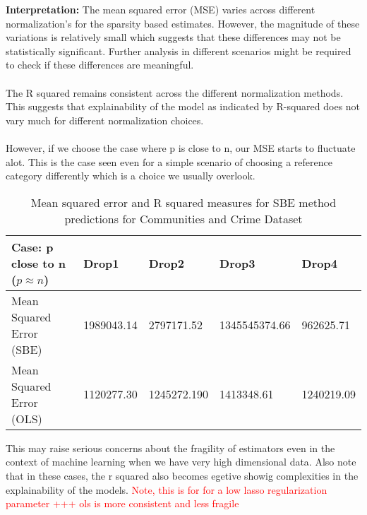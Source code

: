 \textbf{Interpretation:} 
The mean squared error (MSE) varies across different normalization's for the sparsity based estimates. However, the magnitude of these variations is relatively small which suggests that these differences may not be statistically significant. Further analysis in different scenarios might be required to check if these differences are meaningful. \\
\\
The R squared remains consistent across the different normalization methods. This suggests that explainability of the model as indicated by R-squared does not vary much for different normalization choices. \\
\\
However, if we choose the case where p is close to n, our MSE starts to fluctuate alot. This is the case seen even for a simple scenario of choosing a reference category differently which is a choice we usually overlook. 
\begin{table}[h!]
\renewcommand{\arraystretch}{1.5}
\centering
\begin{tabular}{||l l l l l||} 
 \hline
 \hline
 Case: p close to n ($p \approx n$) & Drop1 & Drop2 & Drop3 & Drop4 \\ [0.5ex] 
 \hline \hline
 Mean Squared Error (SBE) & 1989043.14 & 2797171.52 & 1345545374.66 & 962625.71 \\ 
 Mean Squared Error (OLS) & 1120277.30 & 1245272.190 & 1413348.61 & 1240219.09 \\ 

 \hline \hline
\end{tabular}
\caption{Mean squared error and R squared measures for SBE method predictions for Communities and Crime Dataset}
\label{table:1}
\end{table}
This may raise serious concerns about the fragility of estimators even in the context of machine learning when we have very high dimensional data. Also note that in these cases, the r squared also becomes egetive showig complexities in the explainability of the models. \textcolor{red}{Note, this is for for a low lasso regularization parameter +++ ols is more consistent and less fragile}